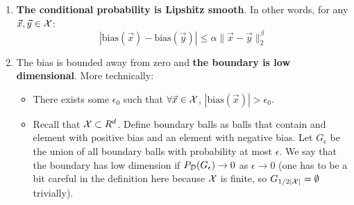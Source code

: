 \documentclass{article}
\newcommand{\X}{{\cal X}}
\newcommand{\D}{{\cal D}}
\newcommand{\x}{\vec{x}}
\newcommand{\y}{\vec{y}}
\newcommand{\bias}{\text{bias}}
\begin{document}
\begin{enumerate}
\item
  {\bf The conditional probability is Lipshitz smooth}. In other words, for
any $\x,\y \in \X$:
\[
|\bias(\x) - \bias(\y)| \leq \alpha \|\x-\y\|_2^{\beta}
\]
\item
The bias is bounded away from zero and {\bf the boundary is low
dimensional}. More technically:
\begin{itemize}
\item There exists some $\epsilon_0$ such that $\forall \x \in \X$, $|\bias(\x)|>\epsilon_0$.
\item Recall that $\X \subset R^d$. Define boundary balls as balls
  that contain and element with positive bias and an element with
  negative bias. Let $G_{\epsilon}$ be the union of all boundary balls
  with probability at most $\epsilon$. We say that the boundary has
  low dimension if $P_{\D}(G_{\epsilon}) \to 0$ as $\epsilon \to 0$
  (one has to be a bit careful in the definition here because $\X$ is finite, so
  $G_{1/2|\X|}=\emptyset$ trivially).  
\end{itemize}
\end{enumerate}
\end{document}
